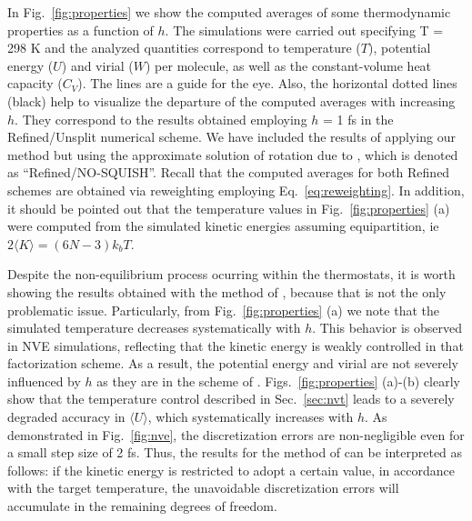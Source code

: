 \documentclass[
journal=jctcce,
layout=twocolumn
]{achemso}
\newcommand{\timestep}{h}
\begin{document}
In Fig.~\ref{fig:properties} we show the computed averages of some thermodynamic properties as a function of $\timestep$. The simulations were carried out specifying T = 298 K and the analyzed quantities correspond to temperature ($T$), potential energy ($U$) and virial ($W$) per molecule, as well as the constant-volume heat capacity ($C_V$).
The lines are a guide for the eye. 
Also, the horizontal dotted lines (black) help to visualize the departure of the computed averages with increasing $\timestep$.
They correspond to the results obtained employing $\timestep$ = 1 fs in the Refined/Unsplit numerical scheme.
We have included the results of applying our method but using the approximate solution of rotation due to \citeauthor{Miller_2002} \cite{Miller_2002}, which is denoted as ``Refined/NO-SQUISH''.
Recall that the computed averages for both Refined schemes are obtained via reweighting employing Eq.~\eqref{eq:reweighting}. 
In addition, it should be pointed out that the temperature values in Fig.~\ref{fig:properties} (a) were computed from the simulated kinetic energies assuming equipartition, ie $2 \langle K \rangle = (6N -3) k_b T$.

Despite the non-equilibrium process ocurring within the thermostats, it is worth showing the results obtained with the method of \citeauthor{Kamberaj_2005} \cite{Kamberaj_2005}, because that is not the only problematic issue.
Particularly, from Fig.~\ref{fig:properties} (a) we note that the simulated temperature decreases systematically with $\timestep$.
This behavior is observed in NVE simulations\cite{Davidchack_2010, Silveira_2017}, reflecting that the kinetic energy is weakly controlled in that factorization scheme.
As a result, the potential energy and virial are not severely influenced by $\timestep$ as they are in the scheme of \citeauthor{Martyna_1996} \cite{Martyna_1996}. Figs.~\ref{fig:properties} (a)-(b) clearly show that the temperature control described in Sec.~\ref{sec:nvt} leads to a severely degraded accuracy in $\langle U \rangle$, which systematically increases with $\timestep$.
As demonstrated in Fig.~\ref{fig:nve}, the discretization errors are non-negligible even for a small step size of 2 fs.
Thus, the results for the method of \citeauthor{Martyna_1996} \cite{Martyna_1996} can be interpreted as follows: if the kinetic energy is restricted to adopt a certain value, in accordance with the target temperature, the unavoidable discretization errors will accumulate in the remaining degrees of freedom.
\end{document}
